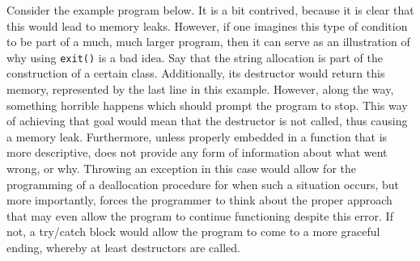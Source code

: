 Consider the example program below. It is a bit contrived, because it is clear that this would lead to memory leaks. However, if one imagines this type of condition to be part of a much, much larger program, then it can serve as an illustration of why using \texttt{exit()} is a bad idea. Say that the string allocation is part of the construction of a certain class. Additionally, its destructor would return this memory, represented by the last line in this example. However, along the way, something horrible happens which should prompt the program to stop. This way of achieving that goal would mean that the destructor is not called, thus causing a memory leak. Furthermore, unless properly embedded in a function that is more descriptive, does not provide any form of information about what went wrong, or why. Throwing an exception in this case would allow for the programming of a deallocation procedure for when such a situation occurs, but more importantly, forces the programmer to think about the proper approach that may even allow the program to continue functioning despite this error. If not, a try/catch block would allow the program to come to a more graceful ending, whereby at least destructors are called.
